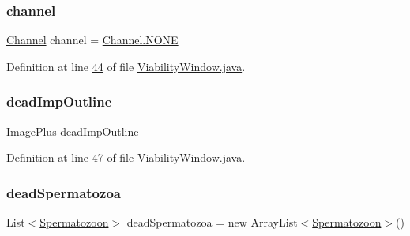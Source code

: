 \subsubsection{\texorpdfstring{channel}{channel}}
{\footnotesize\ttfamily \hyperlink{enumgui_1_1_viability_window_1_1_channel}{Channel} channel = \hyperlink{enumgui_1_1_viability_window_1_1_channel_a899caa602e4fff675b17cdbab33607ec}{Channel.\+N\+O\+NE}\hspace{0.3cm}{\ttfamily [private]}}



Definition at line \hyperlink{_viability_window_8java_source_l00044}{44} of file \hyperlink{_viability_window_8java_source}{Viability\+Window.\+java}.

\hypertarget{classgui_1_1_viability_window_ae10626a8a263ac741e63d226c8375114}{}\label{classgui_1_1_viability_window_ae10626a8a263ac741e63d226c8375114} 
\subsubsection{\texorpdfstring{dead\+Imp\+Outline}{deadImpOutline}}
{\footnotesize\ttfamily Image\+Plus dead\+Imp\+Outline\hspace{0.3cm}{\ttfamily [private]}}



Definition at line \hyperlink{_viability_window_8java_source_l00047}{47} of file \hyperlink{_viability_window_8java_source}{Viability\+Window.\+java}.

\hypertarget{classgui_1_1_viability_window_a4f0cf0c5a0eb117170a840a24ebe2a3c}{}\label{classgui_1_1_viability_window_a4f0cf0c5a0eb117170a840a24ebe2a3c} 
\subsubsection{\texorpdfstring{dead\+Spermatozoa}{deadSpermatozoa}}
{\footnotesize\ttfamily List$<$\hyperlink{classdata_1_1_spermatozoon}{Spermatozoon}$>$ dead\+Spermatozoa = new Array\+List$<$\hyperlink{classdata_1_1_spermatozoon}{Spermatozoon}$>$()\hspace{0.3cm}{\ttfamily [protected]}}



